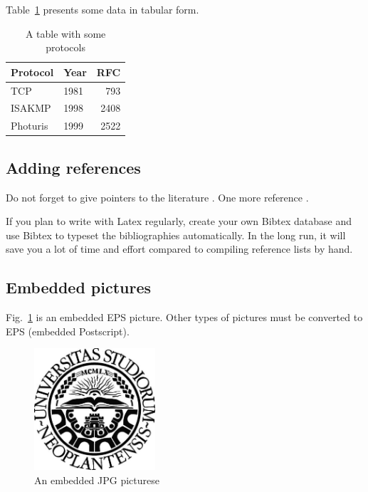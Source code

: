\documentclass[a4paper,12pt]{article}
\begin{document}
Table~\ref{tab:mytable1} presents some data in tabular form. 

\begin{table}[t]
  \begin{center}
    \begin{tabular}{|l|lr|}
    \hline
    Protocol & Year &  RFC \\
    \hline
    TCP      & 1981 &  793 \\
    ISAKMP   & 1998 & 2408 \\
    Photuris & 1999 & 2522 \\
    \hline
    \end{tabular}
    \caption{A table with some protocols}
    \label{tab:mytable1}
  \end{center}
\end{table}




\subsection{Adding references}\label{sec:references}

Do not forget to give pointers to the literature
\cite{DifHel76,HarCar98,AbaNee94}.  One more reference
\cite{Amoroso94}.

If you plan to write with Latex regularly, create your own Bibtex
database and use Bibtex to typeset the bibliographies automatically.
In the long run, it will save you a lot of time and effort compared to
compiling reference lists by hand.




\subsection{Embedded pictures}\label{sec:pictures}

Fig.~\ref{fig:mypicture1} is an embedded EPS picture. Other types of pictures must be converted to EPS (embedded Postscript).

\begin{figure}[t]
  \begin{center}
    \includegraphics[width=0.4\textwidth,height=0.4\textheight,keepaspectratio]{NoviSadLogoGray.jpg}
    \caption{An embedded JPG picturese }
    \label{fig:mypicture1}
  \end{center}
\end{figure}
\end{document}
